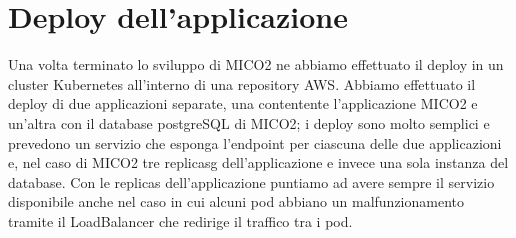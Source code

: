 \section{Deploy dell'applicazione}
Una volta terminato lo sviluppo di MICO2 ne abbiamo effettuato il deploy in un cluster Kubernetes all'interno di una repository AWS.
Abbiamo effettuato il deploy di due applicazioni separate, una contentente l'applicazione MICO2 e un'altra con il database postgreSQL di MICO2; i deploy sono molto semplici e prevedono un servizio che esponga l'endpoint per ciascuna delle due applicazioni e, nel caso di MICO2 tre \gls{replicasg} dell'applicazione e invece una sola instanza del database.
Con le replicas dell'applicazione puntiamo ad avere sempre il servizio disponibile anche nel caso in cui alcuni pod abbiano un malfunzionamento tramite il LoadBalancer che redirige il traffico tra i pod.

